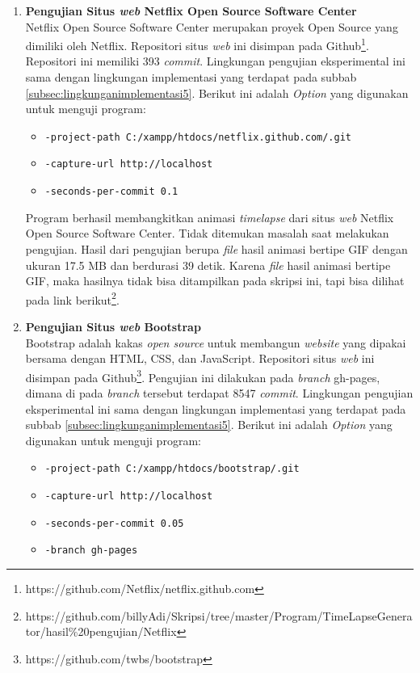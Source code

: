 \begin{enumerate}
\item \textbf{Pengujian Situs \textit{web} Netflix Open Source Software Center}\\
Netflix Open Source Software Center merupakan proyek Open Source yang dimiliki oleh Netflix. Repositori situs \textit{web} ini disimpan pada Github\footnote{https://github.com/Netflix/netflix.github.com}. Repositori ini memiliki 393 \textit{commit}. Lingkungan pengujian eksperimental ini sama dengan lingkungan implementasi yang terdapat pada subbab \ref{subsec:lingkunganimplementasi5}. Berikut ini adalah \textit{Option} yang digunakan untuk menguji program:
\begin{itemize}
\item \texttt{-project-path C:/xampp/htdocs/netflix.github.com/.git}
\item \texttt{-capture-url http://localhost}
\item \texttt{-seconds-per-commit 0.1} 
\end{itemize}
Program berhasil membangkitkan animasi \textit{timelapse} dari situs \textit{web} Netflix Open Source Software Center. Tidak ditemukan masalah saat melakukan pengujian. Hasil dari pengujian berupa \textit{file} hasil animasi bertipe GIF dengan ukuran 17.5 MB dan berdurasi 39 detik. Karena \textit{file} hasil animasi bertipe GIF, maka hasilnya tidak bisa ditampilkan pada skripsi ini, tapi bisa dilihat pada link berikut\footnote{https://github.com/billyAdi/Skripsi/tree/master/Program/TimeLapseGenerator/hasil\%20pengujian/Netflix}.


\item \textbf{Pengujian Situs \textit{web} Bootstrap}\\
Bootstrap adalah kakas \textit{open source} untuk membangun \textit{website} yang dipakai bersama dengan HTML, CSS, dan JavaScript. Repositori situs \textit{web} ini disimpan pada Github\footnote{https://github.com/twbs/bootstrap}. Pengujian ini dilakukan pada \textit{branch} gh-pages, dimana di pada \textit{branch} tersebut terdapat 8547 \textit{commit}. Lingkungan pengujian eksperimental ini sama dengan lingkungan implementasi yang terdapat pada subbab \ref{subsec:lingkunganimplementasi5}. 
Berikut ini adalah \textit{Option} yang digunakan untuk menguji program:
\begin{itemize}
\item \texttt{-project-path C:/xampp/htdocs/bootstrap/.git}
\item \texttt{-capture-url http://localhost}
\item \texttt{-seconds-per-commit 0.05} 
\item \texttt{-branch gh-pages}
\end{itemize}


\end{enumerate}
